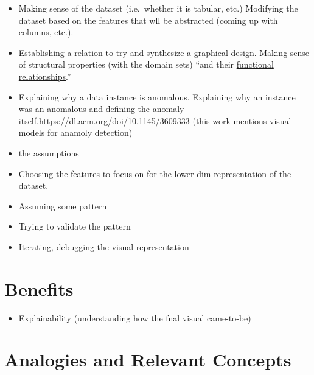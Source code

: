 \documentclass[
]{article}
\providecommand{\tightlist}{%
  \setlength{\itemsep}{0pt}\setlength{\parskip}{0pt}}\usepackage{longtable,booktabs,array}
\begin{document}
\begin{itemize}
\item
  Making sense of the dataset (i.e.~whether it is tabular, etc.)
  Modifying the dataset based on the features that wll be abstracted
  (coming up with columns, etc.).
\item
  Establishing a relation to try and synthesize a graphical design.
  Making sense of structural properties (with the domain sets) ``and
  their
  \href{https://dl.acm.org/doi/pdf/10.1145/22949.22950?curius=2438}{functional
  relationships}.''
\item
  Explaining why a data instance is anomalous. Explaining why an
  instance was an anomalous and defining the anomaly
  itself.https://dl.acm.org/doi/10.1145/3609333 (this work mentions
  visual models for anamoly detection)
\item
  the assumptions
\item
  Choosing the features to focus on for the lower-dim representation of
  the dataset.
\item
  Assuming some pattern
\item
  Trying to validate the pattern
\item
  Iterating, debugging the visual representation
\end{itemize}

\section{Benefits}\label{benefits}

\begin{itemize}
\tightlist
\item
  Explainability (understanding how the fnal visual came-to-be)
\end{itemize}

\section{Analogies and Relevant
Concepts}\label{analogies-and-relevant-concepts}
\end{document}
